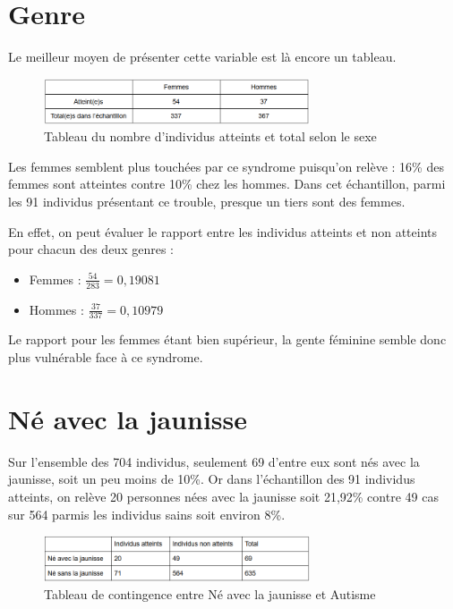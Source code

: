 \documentclass[12,french]{report}
\begin{document}
\section{Genre}
Le meilleur moyen de présenter cette variable est là encore un tableau.\\

\begin{figure}[!ht]
	\center
	\includegraphics[width=0.7\textwidth]{./Images/7}
	\caption{Tableau du nombre d'individus atteints et total selon le sexe}
\end{figure}\vspace{0.1cm}

	Les femmes semblent plus touchées par ce syndrome puisqu’on relève : 16\% des femmes sont atteintes contre 10\% chez les hommes. Dans cet échantillon, parmi les 91 individus présentant ce trouble, presque un tiers sont des femmes.

    En effet, on peut évaluer le rapport entre les individus atteints et non atteints pour chacun des deux genres :

\begin{itemize}
	\item Femmes : $\frac{54}{283}=0,19081$
	\item Hommes : $\frac{37}{337}=0,10979$
\end{itemize}

	Le rapport pour les femmes étant bien supérieur, la gente féminine semble donc plus vulnérable face à ce syndrome.

\section{Né avec la jaunisse}
	Sur l’ensemble des 704 individus, seulement 69 d’entre eux sont nés avec la jaunisse, soit un peu moins de 10\%. Or dans l’échantillon des 91 individus atteints, on relève 20 personnes nées avec la jaunisse soit 21,92\% contre 49 cas sur 564 parmis les individus sains soit environ 8\%. \\

\begin{figure}[!ht]
	\center
	\includegraphics[width=0.7\textwidth]{./Images/8}
	\caption{Tableau de contingence entre Né avec la jaunisse et Autisme}
\end{figure}\vspace{0.1cm}
\end{document}
